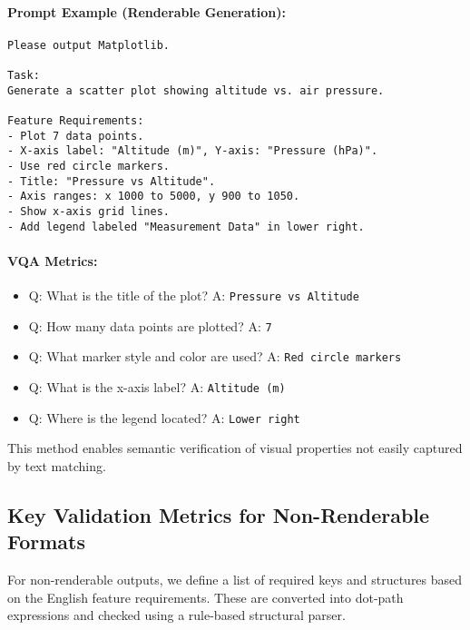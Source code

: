 \paragraph{Prompt Example (Renderable Generation):}
\begin{lstlisting}[breaklines=true, basicstyle=\ttfamily\small]
Please output Matplotlib.

Task:
Generate a scatter plot showing altitude vs. air pressure.

Feature Requirements:
- Plot 7 data points.
- X-axis label: "Altitude (m)", Y-axis: "Pressure (hPa)".
- Use red circle markers.
- Title: "Pressure vs Altitude".
- Axis ranges: x 1000 to 5000, y 900 to 1050.
- Show x-axis grid lines.
- Add legend labeled "Measurement Data" in lower right.
\end{lstlisting}

\paragraph{VQA Metrics:}
\begin{itemize}
    \item Q: What is the title of the plot? \quad A: \texttt{Pressure vs Altitude}
    \item Q: How many data points are plotted? \quad A: \texttt{7}
    \item Q: What marker style and color are used? \quad A: \texttt{Red circle markers}
    \item Q: What is the x-axis label? \quad A: \texttt{Altitude (m)}
    \item Q: Where is the legend located? \quad A: \texttt{Lower right}
\end{itemize}

This method enables semantic verification of visual properties not easily captured by text matching.

\subsection{Key Validation Metrics for Non-Renderable Formats}

For non-renderable outputs, we define a list of required keys and structures based on the English feature requirements. These are converted into dot-path expressions and checked using a rule-based structural parser.

